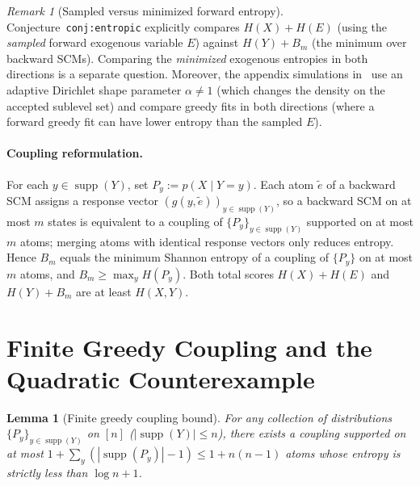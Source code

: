 \documentclass[11pt]{article}
\theoremstyle{plain}
\newtheorem{lemma}[theorem]{Lemma}
\theoremstyle{definition}
\theoremstyle{remark}
\newtheorem{remark}{Remark}
\DeclareMathOperator{\supp}{supp}
\begin{document}
\begin{remark}[Sampled versus minimized forward entropy]
Conjecture~\texttt{conj:entropic} explicitly compares $H(X) + H(E)$ (using the \emph{sampled} forward exogenous variable $E$) against $H(Y) + B_m$ (the minimum over backward SCMs). Comparing the \emph{minimized} exogenous entropies in both directions is a separate question. Moreover, the appendix simulations in~\cite{Compton2020} use an adaptive Dirichlet shape parameter $\alpha \neq 1$ (which changes the density on the accepted sublevel set) and compare greedy fits in both directions (where a forward greedy fit can have lower entropy than the sampled $E$).
\end{remark}

\paragraph{Coupling reformulation.}
For each $y \in \supp(Y)$, set $P_y := p(X \mid Y = y)$. Each atom $\tilde e$ of a backward SCM assigns a response vector $(g(y, \tilde e))_{y \in \supp(Y)}$, so a backward SCM on at most $m$ states is equivalent to a coupling of $\{P_y\}_{y \in \supp(Y)}$ supported on at most $m$ atoms; merging atoms with identical response vectors only reduces entropy. Hence $B_m$ equals the minimum Shannon entropy of a coupling of $\{P_y\}$ on at most $m$ atoms, and $B_m \ge \max_y H(P_y)$. Both total scores $H(X) + H(E)$ and $H(Y) + B_m$ are at least $H(X, Y)$.

\section{Finite Greedy Coupling and the Quadratic Counterexample}

\begin{lemma}[Finite greedy coupling bound]\label{lem:greedy}
For any collection of distributions $\{P_y\}_{y \in \supp(Y)}$ on $[n]$ ($|\supp(Y)| \le n$), there exists a coupling supported on at most $1 + \sum_y (|\supp(P_y)| - 1) \le 1 + n(n-1)$ atoms whose entropy is strictly less than $\log n + 1$.
\end{lemma}
\end{document}
